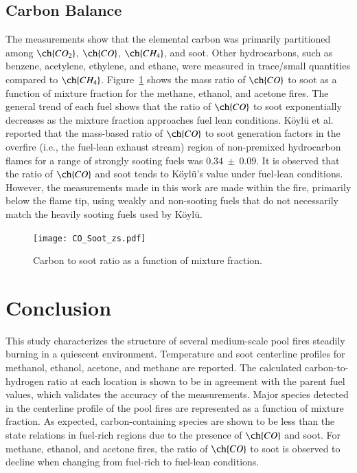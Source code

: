 \documentclass[preprint,review,12pt]{elsarticle}
\begin{document}
\subsection{Carbon Balance}
\label{ssec:Carbon Balance}
The measurements show that the elemental carbon was primarily partitioned among $\ch{CO_{2}}$, $\ch{CO}$, $\ch{CH_{4}}$, and soot. Other hydrocarbons, such as benzene, acetylene, ethylene, and ethane, were measured in trace/small quantities compared to $\ch{CH_{4}}$. Figure~\ref{fig:C2S} shows the mass ratio of $\ch{CO}$ to soot as a function of mixture fraction for the methane, ethanol, and acetone fires. The general trend of each fuel shows that the ratio of $\ch{CO}$ to soot exponentially decreases as the mixture fraction approaches fuel lean conditions. K\"{o}yl\"{u} et al.~\cite{koylu1991} reported that the mass-based ratio of $\ch{CO}$ to soot generation factors in the overfire (i.e., the fuel-lean exhaust stream) region of non-premixed hydrocarbon flames for a range of strongly sooting fuels was $0.34~\pm~0.09$. It is observed that the ratio of $\ch{CO}$ and soot tends to K\"{o}yl\"{u}'s value under fuel-lean conditions. However, the measurements made in this work are made within the fire, primarily below the flame tip, using weakly and non-sooting fuels that do not necessarily match the heavily sooting fuels used by K\"{o}yl\"{u}.

\begin{figure}[h!]
	\centering
\texttt{[image: CO\_Soot\_zs.pdf]}
	\caption[Carbon to soot ratio as a function of mixture fraction]{Carbon to soot ratio as a function of mixture fraction.}
	\label{fig:C2S}
\end{figure}

\section{Conclusion}
\label{sec:Conclusion}
This study characterizes the structure of several medium-scale pool fires steadily burning in a quiescent environment. Temperature and soot centerline profiles for methanol, ethanol, acetone, and methane are reported. The calculated carbon-to-hydrogen ratio at each location is shown to be in agreement with the parent fuel values, which validates the accuracy of the measurements. Major species detected in the centerline profile of the pool fires are represented as a function of mixture fraction. As expected, carbon-containing species are shown to be less than the state relations in fuel-rich regions due to the presence of $\ch{CO}$ and soot. For methane, ethanol, and acetone fires, the ratio of $\ch{CO}$ to soot is observed to decline when changing from fuel-rich to fuel-lean conditions. 
\end{document}

